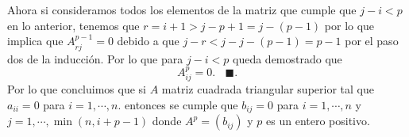 \documentclass[11pt,letterpaper]{article}
\newcommand{\finf}{\blacksquare.}
\begin{document}
\begin{enumerate}
Ahora si consideramos todos los elementos de la matriz que cumple que $j-i<p$ en lo anterior, tenemos que $r=i+1>j-p+1=j-(p-1)$ por lo que implica que $A^{p-1}_{rj}=0$ debido a que $j-r<j-j-(p-1)=p-1$ por el paso dos de la inducción. 
Por lo que para $j-i<p$ queda demostrado que
$$A_{ij}^p=0.\ \ \ \ \finf$$
Por lo que concluimos que si $A$ matriz cuadrada triangular superior tal que $a_{ii}=0$ para $i=1,\cdots,n.$ entonces se cumple que $b_{ij}=0$ para $i=1,\cdots,n$ y $j=1,\cdots,\min (n,i+p-1)$ donde $A^p=(b_{ij})$ y $p$ es un entero positivo.
\end{enumerate}
\end{document}
